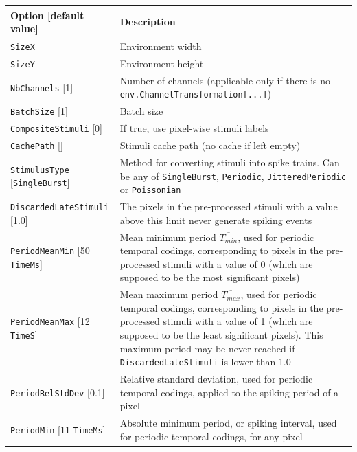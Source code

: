 \documentclass[a4paper,11pt,oneside]{article}
\begin{document}
\begin{center}
 \begin{longtable}{| p{5cm} | p{10cm} | }
 \hline
 Option [default value] & Description\\
 \hline\hline
  \cellcolor{requiredcolor}
  \lstinline!SizeX! & Environment width \\
  \cellcolor{requiredcolor}
  \lstinline!SizeY! & Environment height \\
  \lstinline!NbChannels! [1] & Number of channels (applicable only if there is
   no \lstinline!env.ChannelTransformation[...]!) \\
  \lstinline!BatchSize! [1] & Batch size \\
  \lstinline!CompositeStimuli! [0] & If true, use pixel-wise stimuli labels \\
  \lstinline!CachePath! [] & Stimuli cache path (no cache if left empty) \\
  \hline
  \lstinline!StimulusType! [\lstinline!SingleBurst!] & Method for converting
  stimuli into spike trains. Can be any of \lstinline!SingleBurst!,
   \lstinline!Periodic!, \lstinline!JitteredPeriodic! or
   \lstinline!Poissonian! \\
  \lstinline!DiscardedLateStimuli! [1.0] & The pixels in the pre-processed
  stimuli with a value above this limit never generate spiking events \\
  \lstinline!PeriodMeanMin! [50 \lstinline!TimeMs!] & Mean minimum period
  $\overline{T_{min}}$, used for periodic temporal codings, corresponding to
  pixels in the pre-processed stimuli with a value of 0 (which are supposed to
   be the most significant pixels) \\
  \lstinline!PeriodMeanMax! [12 \lstinline!TimeS!] & Mean maximum period
  $\overline{T_{max}}$, used for periodic temporal codings, corresponding to
  pixels in the pre-processed stimuli with a value of 1 (which are supposed
  to be the least significant pixels). This maximum period may be never reached
   if \lstinline!DiscardedLateStimuli! is lower than 1.0 \\
  \lstinline!PeriodRelStdDev! [0.1] & Relative standard deviation, used for
  periodic temporal codings, applied to the spiking period of a pixel \\
  \lstinline!PeriodMin! [11 \lstinline!TimeMs!] & Absolute minimum period,
  or spiking interval, used for periodic temporal codings, for any pixel \\
 \hline
\end{longtable}
\end{center}
\end{document}
